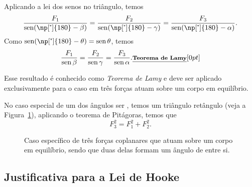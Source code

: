 \noindent{}Aplicando a lei dos senos no triângulo, temos
\begin{equation}
    \frac{F_1}{\sen (\np[\tcdegree]{180} - \beta)} = \frac{F_2}{\sen (\np[\tcdegree]{180} - \gamma)} = \frac{F_3}{\sen (\np[\tcdegree]{180} - \alpha)}.
\end{equation}
%
Como $\sen (\np[\tcdegree]{180} - \theta) = \sen\theta$, temos
\begin{equation}
    \frac{F_1}{\operatorname{sen} \beta} = \frac{F_2}{\operatorname{sen} \gamma} = \frac{F_3}{\operatorname{sen} \alpha}. \relax{\footnotesize\emph{\textbf{Teorema de Lamy}}}[0pt]
\end{equation}

\noindent{}Esse resultado é conhecido como \emph{Teorema de Lamy} e deve ser aplicado exclusivamente para o caso em três forças atuam sobre um corpo em equilíbrio.

No caso especial de um dos ângulos ser , temos um triângulo retângulo (veja a Figura~\ref{Fig:LamyTrianguloRetangulo}), aplicando o teorema de Pitágoras, temos que
\begin{equation}
    F_3^2 = F_1^2 + F_2^2.
\end{equation}

\begin{figure}[!h]\forceversofloat
\centering
{}
\caption{Caso específico de três forças coplanares que atuam sobre um corpo em equilíbrio, sendo que duas delas formam um ângulo de  entre si.\label{Fig:LamyTrianguloRetangulo}}
\end{figure}


\subsection{Justificativa para a Lei de Hooke}

